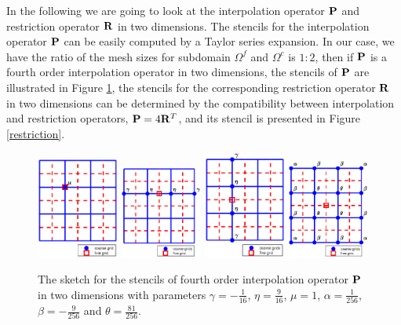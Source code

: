 In the following we are going to look at the interpolation operator ${\bf P}$ and restriction operator ${\bf R}$ in two dimensions. The stencils for the interpolation operator ${\bf P}$ can be easily computed by a Taylor series expansion. In our case, we have the ratio of the mesh sizes for subdomain $\Omega^f$ and $\Omega^c$ is $1:2$, then if  ${\bf P}$ is a fourth order interpolation operator in two dimensions,  the stencils of ${\bf P}$ are illustrated in  Figure \ref{interpolation}, the stencils for the corresponding restriction operator $\bf R$ in two dimensions can be determined by the compatibility between interpolation and restriction operators, ${\bf P} = 4{\bf R}^T$, and its stencil is presented in Figure \ref{restriction}.
\begin{figure}[htbp]
	\centering
	\includegraphics[width=0.24\textwidth,trim={1.8cm 0.8cm 1.4cm 1.2cm}, clip]{interpolation1.eps}
	\includegraphics[width=0.24\textwidth,trim={1.8cm 0.8cm 1.4cm 1.2cm}, clip]{interpolation2.eps}
	\includegraphics[width=0.24\textwidth,trim={1.8cm 0.8cm 1.4cm 1.2cm}, clip]{interpolation3.eps}
	\includegraphics[width=0.24\textwidth,trim={1.8cm 0.8cm 1.4cm 1.2cm}, clip]{interpolation4.eps}
	\caption{The sketch for the stencils of fourth order interpolation operator ${\bf P}$ in two dimensions with parameters $\gamma = -\frac{1}{16}$, $\eta = \frac{9}{16}$, $\mu = 1$, $\alpha = \frac{1}{256}$, $\beta = -\frac{9}{256}$ and $\theta = \frac{81}{256}$. }\label{interpolation}
\end{figure}
